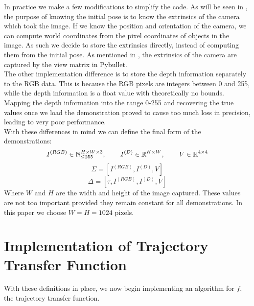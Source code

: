 In practice we make a few modifications to simplify the code. As will be seen in , the purpose of knowing the initial pose is to know the extrinsics of the camera which took the image. If we know the position and orientation of the camera, we can compute world coordinates from the pixel coordinates of objects in the image. As such we decide to store the extrinsics directly, instead of computing them from the initial pose. As mentioned in , the extrinsics of the camera are captured by the view matrix in Pybullet.\\

The other implementation difference is to store the depth information separately to the RGB data. This is because the RGB pixels are integers between 0 and 255, while the depth information is a float value with theoretically no bounds. Mapping the depth information into the range 0-255 and recovering the true values once we load the demonstration proved to cause too much loss in precision, leading to very poor performance.\\

With these differences in mind we can define the final form of the demonstrations:
$$I^{(RGB)} \in \operatorname{\mathbb{N}}^{H \times W \times 3}_{\leq 255}, \operatorname{\operatorname{\: \: \: \:} \operatorname{\: \: \: \:}}
I^{(D)} \in \operatorname{\mathbb{R}}^{H \times W}, \operatorname{\operatorname{\: \: \: \:} \operatorname{\: \: \: \:}}
V \in \operatorname{\mathbb{R}}^{4 \times 4}$$
$$\Sigma = [I^{(RGB)}, I^{(D)}, V]$$
$$\Delta = [\tau, I^{(RGB)}, I^{(D)}, V]$$
Where $W$ and $H$ are the width and height of the image captured. These values are not too important provided they remain constant for all demonstrations. In this paper we choose $W=H=1024$ pixels.


\section{Implementation of Trajectory Transfer Function}
\label{sec:dinobot}%
With these definitions in place, we now begin implementing an algorithm for $f$, the trajectory transfer function.\\

